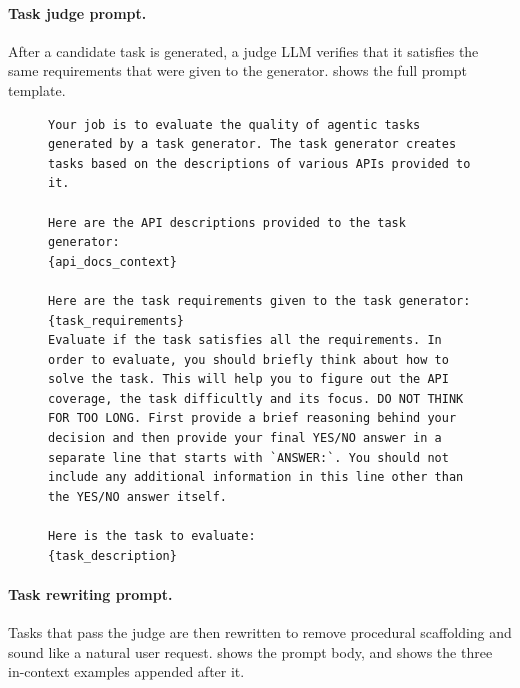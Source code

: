\paragraph{Task judge prompt.}
After a candidate task is generated, a judge LLM verifies that it satisfies the same requirements that were given to the generator.  shows the full prompt template.

\begin{figure}[t]
\begin{lstlisting}[style=prettyprompt, captionpos=b, caption={Task judge prompt.}, label={lst:judge_prompt}]
Your job is to evaluate the quality of agentic tasks generated by a task generator. The task generator creates tasks based on the descriptions of various APIs provided to it.

Here are the API descriptions provided to the task generator:
{api_docs_context}

Here are the task requirements given to the task generator:
{task_requirements}
Evaluate if the task satisfies all the requirements. In order to evaluate, you should briefly think about how to solve the task. This will help you to figure out the API coverage, the task difficultly and its focus. DO NOT THINK FOR TOO LONG. First provide a brief reasoning behind your decision and then provide your final YES/NO answer in a separate line that starts with `ANSWER:`. You should not include any additional information in this line other than the YES/NO answer itself.

Here is the task to evaluate:
{task_description}
\end{lstlisting}
\end{figure}


\paragraph{Task rewriting prompt.}
Tasks that pass the judge are then rewritten to remove procedural scaffolding and sound like a natural user request.  shows the prompt body, and  shows the three in-context examples appended after it.

